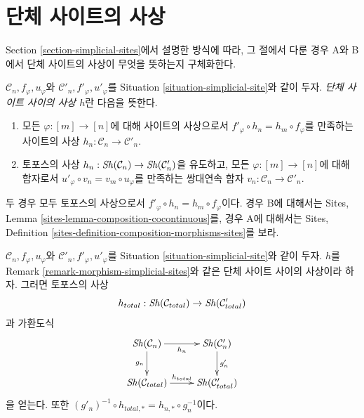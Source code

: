 \section{단체 사이트의 사상}
\label{section-morphism-simplicial-sites}

\noindent
Section \ref{section-simplicial-sites}에서 설명한 방식에 따라,
그 절에서 다룬 경우 A와 B에서 단체 사이트의 사상이 무엇을 뜻하는지
구체화한다.

\begin{remark}
\label{remark-morphism-simplicial-sites}
$\mathcal{C}_n, f_\varphi, u_\varphi$와
$\mathcal{C}'_n, f'_\varphi, u'_\varphi$를 Situation
\ref{situation-simplicial-site}와 같이 두자.
{\it 단체 사이트 사이의 사상 $h$}란 다음을 뜻한다.
\begin{enumerate}
\item[(A)] 모든 $\varphi : [m] \to [n]$에 대해 사이트의 사상으로서
$f'_\varphi \circ h_n = h_m \circ f_\varphi$를 만족하는 사이트의 사상
$h_n : \mathcal{C}_n \to \mathcal{C}'_n$.
\item[(B)] 토포스의 사상 $h_n : \mathop{\mathit{Sh}}\nolimits(\mathcal{C}_n) \to \mathop{\mathit{Sh}}\nolimits(\mathcal{C}'_n)$을
유도하고, 모든 $\varphi : [m] \to [n]$에 대해 함자로서
$u'_\varphi \circ v_n = v_m \circ u_\varphi$를 만족하는 쌍대연속 함자
$v_n : \mathcal{C}_n \to \mathcal{C}'_n$.
\end{enumerate}
두 경우 모두 토포스의 사상으로서
$f'_\varphi \circ h_n = h_m \circ f_\varphi$이다. 경우 B에 대해서는
Sites, Lemma \ref{sites-lemma-composition-cocontinuous}를, 경우 A에 대해서는
Sites, Definition \ref{sites-definition-composition-morphisms-sites}를 보라.
\end{remark}

\begin{lemma}
\label{lemma-morphism-simplicial-sites}
$\mathcal{C}_n, f_\varphi, u_\varphi$와
$\mathcal{C}'_n, f'_\varphi, u'_\varphi$를 Situation
\ref{situation-simplicial-site}와 같이 두자. $h$를 Remark
\ref{remark-morphism-simplicial-sites}와 같은 단체 사이트 사이의 사상이라 하자.
그러면 토포스의 사상
$$
h_{total} : \mathop{\mathit{Sh}}\nolimits(\mathcal{C}_{total}) \to \mathop{\mathit{Sh}}\nolimits(\mathcal{C}'_{total})
$$
과 가환도식
$$
\xymatrix{
\Sh(\mathcal{C}_n) \ar[d]_{g_n} \ar[r]_{h_n} &
\Sh(\mathcal{C}'_n) \ar[d]^{g'_n} \\
\Sh(\mathcal{C}_{total}) \ar[r]^{h_{total}} &
\Sh(\mathcal{C}'_{total})
}
$$
을 얻는다. 또한
$(g'_n)^{-1} \circ h_{total, *} = h_{n, *} \circ g_n^{-1}$이다.
\end{lemma}

